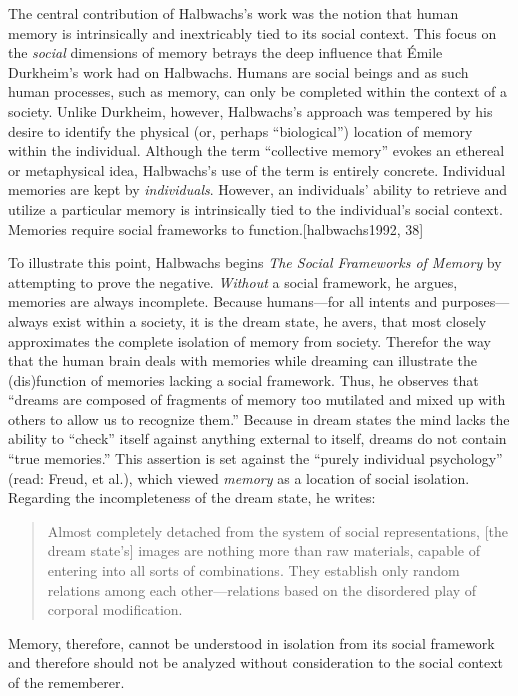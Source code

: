 The central contribution of Halbwachs's work was the notion that human
memory is intrinsically and inextricably tied to its social context.
This focus on the \emph{social} dimensions of memory betrays the deep
influence that Émile Durkheim's work had on Halbwachs. Humans are social
beings and as such human processes, such as memory, can only be
completed within the context of a society. Unlike Durkheim, however,
Halbwachs's approach was tempered by his desire to identify the physical
(or, perhaps ``biological'') location of memory within the individual.
Although the term ``collective memory'' evokes an ethereal or
metaphysical idea, Halbwachs's use of the term is entirely concrete.
Individual memories are kept by \emph{individuals}. However, an
individuals' ability to retrieve and utilize a particular memory is
intrinsically tied to the individual's social context. Memories require
social frameworks to function.{[}halbwachs1992, 38{]}

To illustrate this point, Halbwachs begins \emph{The Social Frameworks
of Memory} by attempting to prove the negative. \emph{Without} a social
framework, he argues, memories are always incomplete. Because
humans---for all intents and purposes---always exist within a society,
it is the dream state, he avers, that most closely approximates the
complete isolation of memory from society. Therefor the way that the
human brain deals with memories while dreaming can illustrate the
(dis)function of memories lacking a social framework. Thus, he observes
that ``dreams are composed of fragments of memory too mutilated and
mixed up with others to allow us to recognize them.'' Because in dream
states the mind lacks the ability to ``check'' itself against anything
external to itself, dreams do not contain ``true
memories.''\autocite[41]{halbwachs1992} This assertion is set against
the ``purely individual psychology'' (read: Freud, et al.), which viewed
\emph{memory} as a location of social isolation. Regarding the
incompleteness of the dream state, he writes:

\begin{quote}
Almost completely detached from the system of social representations,
{[}the dream state's{]} images are nothing more than raw materials,
capable of entering into all sorts of combinations. They establish only
random relations among each other---relations based on the disordered
play of corporal modification.\autocite[42]{halbwachs1992}
\end{quote}

Memory, therefore, cannot be understood in isolation from its social
framework and therefore should not be analyzed without consideration to
the social context of the rememberer.

